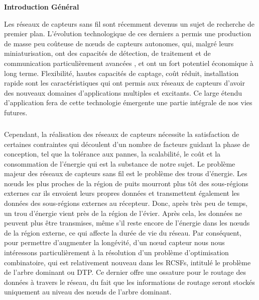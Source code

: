 

\begin{center}
	\Large\textbf{Introduction Général}
\end{center}

Les réseaux de capteurs sans fil sont récemment devenus un sujet de recherche de premier plan. L’évolution technologique de ces derniers a permis une production de masse peu coûteuse de nœuds de capteurs autonomes, qui, malgré leurs miniaturisation, ont des capacités de détection, de traitement et de communication particulièrement avancées \cite{yick2008wireless} , et ont un fort potentiel économique à long terme. Flexibilité, hautes capacités de captage, coût réduit, installation rapide sont les caractéristiques qui ont permis aux réseaux de capteurs d’avoir des nouveaux domaines d’applications multiples et excitants. Ce large étendu d’application fera de cette technologie émergente une partie intégrale de nos vies futures.
\subparagraph{}
Cependant, la réalisation des réseaux de capteurs nécessite la satisfaction de certaines contraintes qui découlent d’un nombre de facteurs guidant la phase de conception, tel que la tolérance aux pannes, la scalabilité, le coût et la consommation de l’énergie qui est la substance de notre sujet.
Le problème majeur des réseaux de capteurs sans fil est le problème des trous d’énergie. Les nœuds les plus proches de la région de puits mourront plus tôt des sous-régions externes car ils envoient leurs propres données et transmettent également les données des sous-régions externes au récepteur. Donc, après très peu de temps, un trou d’énergie vient près de la région de l’évier. Après cela, les données ne peuvent plus être transmises, même s'il reste encore de l'énergie dans les nœuds de la région externe, ce qui affecte la durée de vie du réseau. Par conséquent, pour permettre d’augmenter la  longévité, d’un nœud capteur nous nous intéressons particulièrement à la résolution d’un problème d’optimisation combinatoire, qui est relativement nouveau dans les RCSFs, intitulé le problème de l’arbre dominant ou DTP.  Ce dernier offre une ossature pour le routage des données à travers le réseau, du fait que les informations de routage seront stockés uniquement au niveau des nœuds de l’arbre dominant. 
\subparagraph{}
